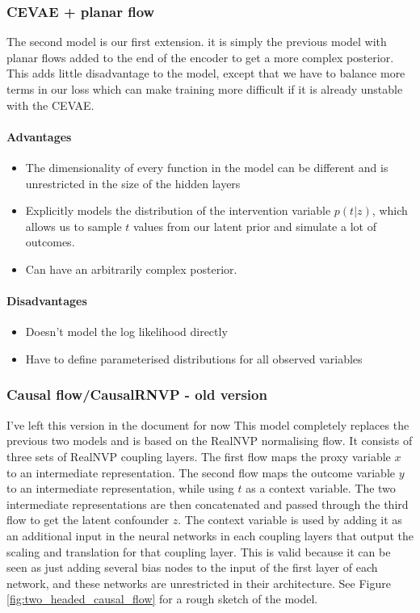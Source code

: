 \documentclass{article}
\begin{document}
\vspace{1cm}
\subsubsection{CEVAE + planar flow}
The second model is our first extension. it is simply the previous model with planar flows added to the end of the encoder to get a more complex posterior. This adds little disadvantage to the model, except that we have to balance more terms in our loss which can make training more difficult if it is already unstable with the CEVAE. 
\paragraph{Advantages}
\begin{itemize}
    \item The dimensionality of every function in the model can be different and is unrestricted in the size of the hidden layers
    \item  Explicitly models the distribution of the intervention variable $p(t|z)$, which allows us to sample $t$ values from our latent prior and simulate a lot of outcomes.
    \item Can have an arbitrarily complex posterior.
\end{itemize}
\paragraph{Disadvantages}
\begin{itemize}
    \item Doesn't model the log likelihood directly
    \item Have to define parameterised distributions for all observed variables
\end{itemize}



\subsubsection{Causal flow/CausalRNVP - old version}
I've left this version in the document for now
This model completely replaces the previous two models and is based on the RealNVP normalising flow. It consists of three sets of RealNVP coupling layers. The first flow maps the proxy variable $x$ to an intermediate representation. The second flow maps the outcome variable $y$ to an intermediate representation, while using $t$ as a context variable. The two intermediate representations are then concatenated and passed through the third flow to get the latent confounder $z$. The context variable is used by adding it as an additional input in the neural networks in each coupling layers that output the scaling and translation for that coupling layer. This is valid because it can be seen as just adding several bias nodes to the input of the first layer of each network, and these networks are unrestricted in their architecture. See Figure \ref{fig:two_headed_causal_flow} for a rough sketch of the model.
\end{document}
